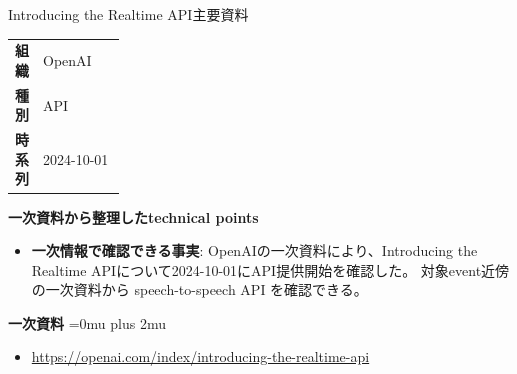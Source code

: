 \begin{technicalnote}{Introducing the Realtime API}{主要資料}
\begingroup
\begin{tabularx}{\linewidth}{@{}>{\bfseries}p{0.22\linewidth}X@{}}
組織 & OpenAI \\
種別 & API \\
時系列 & 2024-10-01 \\
\end{tabularx}
\smallskip
{\bfseries 一次資料から整理したtechnical points}
\begin{itemize}[leftmargin=1.5em,itemsep=0.35em]
\item \textbf{一次情報で確認できる事実}: OpenAIの一次資料により、Introducing the Realtime APIについて2024-10-01にAPI提供開始を確認した。 対象event近傍の一次資料から speech-to-speech API を確認できる。
\end{itemize}
\begin{minipage}{\linewidth}
\begin{samepage}
{\bfseries 一次資料}
\begingroup\sloppy
\Urlmuskip=0mu plus 2mu\relax
\begin{itemize}[leftmargin=1.5em,itemsep=0.25em]
\item {\scriptsize\url{https://openai.com/index/introducing-the-realtime-api}}
\end{itemize}
\endgroup
\end{samepage}
\end{minipage}
\endgroup
\end{technicalnote}
\medskip

